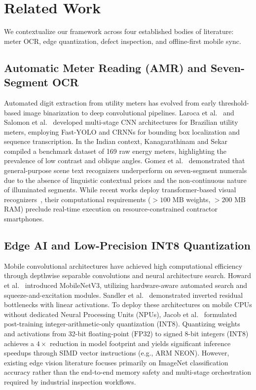 \documentclass[conference]{IEEEtran}
\begin{document}
\section{Related Work}
We contextualize our framework across four established bodies of literature: meter OCR, edge quantization, defect inspection, and offline-first mobile sync.

\subsection{Automatic Meter Reading (AMR) and Seven-Segment OCR}
Automated digit extraction from utility meters has evolved from early threshold-based image binarization to deep convolutional pipelines. Laroca et al.~\cite{laroca2019convolutional} and Salomon et al.~\cite{salomon2020deep} developed multi-stage CNN architectures for Brazilian utility meters, employing Fast-YOLO and CRNNs for bounding box localization and sequence transcription. In the Indian context, Kanagarathinam and Sekar~\cite{kanagarathinam2019text} compiled a benchmark dataset of 169 raw energy meters, highlighting the prevalence of low contrast and oblique angles. Gomez et al.~\cite{gomez2018reading} demonstrated that general-purpose scene text recognizers underperform on seven-segment numerals due to the absence of linguistic contextual priors and the non-continuous nature of illuminated segments. While recent works deploy transformer-based visual recognizers~\cite{wang2023yolov7, liu2024visual}, their computational requirements ($>100\text{~MB}$ weights, $>200\text{~MB}$ RAM) preclude real-time execution on resource-constrained contractor smartphones.

\subsection{Edge AI and Low-Precision INT8 Quantization}
Mobile convolutional architectures have achieved high computational efficiency through depthwise separable convolutions and neural architecture search. Howard et al.~\cite{howard2019searching} introduced MobileNetV3, utilizing hardware-aware automated search and squeeze-and-excitation modules. Sandler et al.~\cite{sandler2018mobilenetv2} demonstrated inverted residual bottlenecks with linear activations. To deploy these architectures on mobile CPUs without dedicated Neural Processing Units (NPUs), Jacob et al.~\cite{jacob2018quantization} formulated post-training integer-arithmetic-only quantization (INT8). Quantizing weights and activations from 32-bit floating-point ($\text{FP32}$) to signed 8-bit integers ($\text{INT8}$) achieves a $4\times$ reduction in model footprint and yields significant inference speedups through SIMD vector instructions (e.g., ARM NEON). However, existing edge vision literature focuses primarily on ImageNet classification accuracy rather than the end-to-end memory safety and multi-stage orchestration required by industrial inspection workflows.
\end{document}
